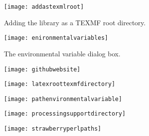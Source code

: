 \begin{figure}
	\centering
	\texttt{[image: addastexmlroot]}
	\caption[Adding the library as a TEXMF root directory]{Adding the library as a TEXMF root directory.}
	\label{fig:addastexmlroot}
\end{figure}

\begin{figure}
	\centering
	\texttt{[image: enironmentalvariables]}
	\caption[The environmental variable dialog box]{The environmental variable dialog box.}
	\label{fig:enironmentalvariables}
\end{figure}


\begin{figure}
	\centering
	\texttt{[image: githubwebsite]}
	\caption[]{}
	\label{fig:githubwebsite}
\end{figure}

\begin{figure}
	\centering
	\texttt{[image: latexroottexmfdirectory]}
	\caption[]{}
	\label{fig:latexroottexmfdirectory}
\end{figure}


\begin{figure}
	\centering
	\texttt{[image: pathenvironmentalvariable]}
	\caption[]{}
	\label{fig:pathenvironmentalvariable}
\end{figure}

\begin{figure}
	\centering
	\texttt{[image: processingsupportdirectory]}
	\caption[]{}
	\label{fig:processingsupportdirectory}
\end{figure}

\begin{figure}
	\centering
	\texttt{[image: strawberryperlpaths]}
	\caption[]{}
	\label{fig:strawberryperlpaths}
\end{figure}
